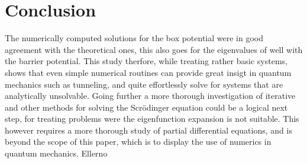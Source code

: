 \documentclass{article}
\begin{document}
\section{Conclusion}
The numerically computed solutions for the box potential were in good agreement with the theoretical ones, this also goes for the eigenvalues of well with the barrier potential. This study therfore, while treating rather basic systems, shows that even simple numerical routines can provide great insigt in quantum mechanics such as tunneling, and quite effortlessly solve for systems that are analytically unsolvable. Going further a more thorough investigation of iterative and other methods for solving the Scrödinger equation could be a logical next step, for treating problems were the eigenfunction expansion is not suitable. This however requires a more thorough study of partial differential equations, and is beyond the scope of this paper, which is to display the use of numerics in quantum mechanics.  Ellerno
\end{document}
